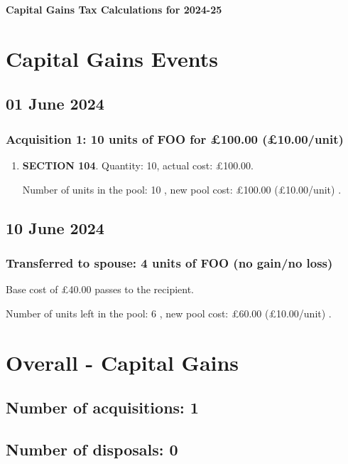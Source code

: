 \documentclass{article}
\begin{document}
\centerline{\Large\bfseries Capital Gains Tax Calculations for 2024-25}

\section*{Capital Gains Events}


\subsection*{01 June 2024}
\subsubsection*{
    Acquisition 1: 10 units of FOO for £100.00
    (£10.00/unit)%
}

\begin{enumerate}
\item \textbf{SECTION 104}. Quantity: 10,
    actual cost: £100.00.

    Number of units in the pool:
    10%
,
    new pool cost: £100.00
    (£10.00/unit)%
.

\end{enumerate}



\subsection*{10 June 2024}
\subsubsection*{
    Transferred to spouse: 4 units of FOO (no gain/no loss)
}
Base cost of £40.00 passes to the recipient.

Number of units left in the pool: 6%
,
    new pool cost: £60.00
    (£10.00/unit)%
.





\clearpage
\section*{Overall - Capital Gains}
\subsection*{Number of acquisitions: 1}
\subsection*{Number of disposals: 0}
\end{document}
